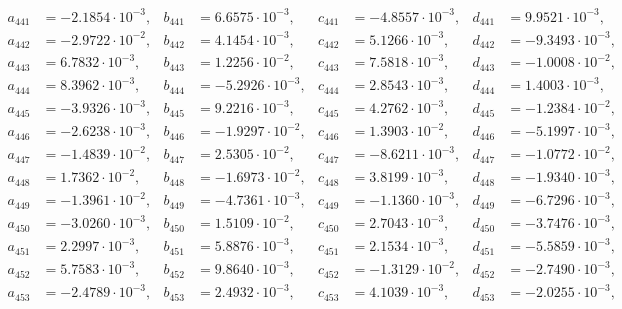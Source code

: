 \begin{align*}
  a_{ 441 } &= -2.1854 \cdot 10^{ -3 }, & b_{ 441 } &= 6.6575 \cdot 10^{ -3 }, & c_{ 441 } &= -4.8557 \cdot 10^{ -3 }, & d_{ 441 } &= 9.9521 \cdot 10^{ -3 }, \\ 
  a_{ 442 } &= -2.9722 \cdot 10^{ -2 }, & b_{ 442 } &= 4.1454 \cdot 10^{ -3 }, & c_{ 442 } &= 5.1266 \cdot 10^{ -3 }, & d_{ 442 } &= -9.3493 \cdot 10^{ -3 }, \\ 
  a_{ 443 } &= 6.7832 \cdot 10^{ -3 }, & b_{ 443 } &= 1.2256 \cdot 10^{ -2 }, & c_{ 443 } &= 7.5818 \cdot 10^{ -3 }, & d_{ 443 } &= -1.0008 \cdot 10^{ -2 }, \\ 
  a_{ 444 } &= 8.3962 \cdot 10^{ -3 }, & b_{ 444 } &= -5.2926 \cdot 10^{ -3 }, & c_{ 444 } &= 2.8543 \cdot 10^{ -3 }, & d_{ 444 } &= 1.4003 \cdot 10^{ -3 }, \\ 
  a_{ 445 } &= -3.9326 \cdot 10^{ -3 }, & b_{ 445 } &= 9.2216 \cdot 10^{ -3 }, & c_{ 445 } &= 4.2762 \cdot 10^{ -3 }, & d_{ 445 } &= -1.2384 \cdot 10^{ -2 }, \\ 
  a_{ 446 } &= -2.6238 \cdot 10^{ -3 }, & b_{ 446 } &= -1.9297 \cdot 10^{ -2 }, & c_{ 446 } &= 1.3903 \cdot 10^{ -2 }, & d_{ 446 } &= -5.1997 \cdot 10^{ -3 }, \\ 
  a_{ 447 } &= -1.4839 \cdot 10^{ -2 }, & b_{ 447 } &= 2.5305 \cdot 10^{ -2 }, & c_{ 447 } &= -8.6211 \cdot 10^{ -3 }, & d_{ 447 } &= -1.0772 \cdot 10^{ -2 }, \\ 
  a_{ 448 } &= 1.7362 \cdot 10^{ -2 }, & b_{ 448 } &= -1.6973 \cdot 10^{ -2 }, & c_{ 448 } &= 3.8199 \cdot 10^{ -3 }, & d_{ 448 } &= -1.9340 \cdot 10^{ -3 }, \\ 
  a_{ 449 } &= -1.3961 \cdot 10^{ -2 }, & b_{ 449 } &= -4.7361 \cdot 10^{ -3 }, & c_{ 449 } &= -1.1360 \cdot 10^{ -3 }, & d_{ 449 } &= -6.7296 \cdot 10^{ -3 }, \\ 
  a_{ 450 } &= -3.0260 \cdot 10^{ -3 }, & b_{ 450 } &= 1.5109 \cdot 10^{ -2 }, & c_{ 450 } &= 2.7043 \cdot 10^{ -3 }, & d_{ 450 } &= -3.7476 \cdot 10^{ -3 }, \\ 
  a_{ 451 } &= 2.2997 \cdot 10^{ -3 }, & b_{ 451 } &= 5.8876 \cdot 10^{ -3 }, & c_{ 451 } &= 2.1534 \cdot 10^{ -3 }, & d_{ 451 } &= -5.5859 \cdot 10^{ -3 }, \\ 
  a_{ 452 } &= 5.7583 \cdot 10^{ -3 }, & b_{ 452 } &= 9.8640 \cdot 10^{ -3 }, & c_{ 452 } &= -1.3129 \cdot 10^{ -2 }, & d_{ 452 } &= -2.7490 \cdot 10^{ -3 }, \\ 
  a_{ 453 } &= -2.4789 \cdot 10^{ -3 }, & b_{ 453 } &= 2.4932 \cdot 10^{ -3 }, & c_{ 453 } &= 4.1039 \cdot 10^{ -3 }, & d_{ 453 } &= -2.0255 \cdot 10^{ -3 }, \\ 

\end{align*}
